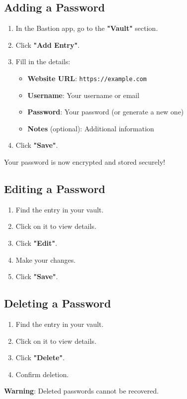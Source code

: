 \documentclass[11pt,a4paper]{article}
\begin{document}
\subsection{Adding a Password}
\begin{enumerate}
    \item In the Bastion app, go to the \textbf{"Vault"} section.
    \item Click \textbf{"Add Entry"}.
    \item Fill in the details:
    \begin{itemize}
        \item \textbf{Website URL}: \texttt{https://example.com}
        \item \textbf{Username}: Your username or email
        \item \textbf{Password}: Your password (or generate a new one)
        \item \textbf{Notes} (optional): Additional information
    \end{itemize}
    \item Click \textbf{"Save"}.
\end{enumerate}
Your password is now encrypted and stored securely!

\subsection{Editing a Password}
\begin{enumerate}
    \item Find the entry in your vault.
    \item Click on it to view details.
    \item Click \textbf{"Edit"}.
    \item Make your changes.
    \item Click \textbf{"Save"}.
\end{enumerate}

\subsection{Deleting a Password}
\begin{enumerate}
    \item Find the entry in your vault.
    \item Click on it to view details.
    \item Click \textbf{"Delete"}.
    \item Confirm deletion.
\end{enumerate}
\textbf{Warning}: Deleted passwords cannot be recovered.
\end{document}
